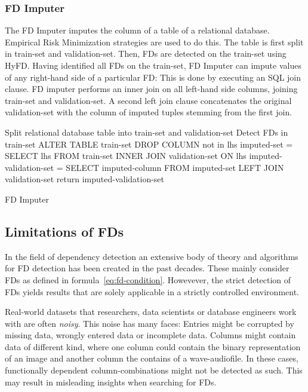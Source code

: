 \subsubsection{FD Imputer}
The FD Imputer imputes the column of a table of a relational database.
Empirical Risk Minimization strategies are used to do this.
The table is first split in train-set and validation-set.
Then, FDs are detected on the train-set using HyFD.\cite{PAP16}
Having identified all FDs on the train-set, FD Imputer can impute values of any right-hand side of a particular FD:
This is done by executing an SQL join clause.
FD imputer performs an inner join on all left-hand side columns, joining train-set and validation-set.
A second left join clause concatenates the original validation-set with the column of imputed tuples stemming from the first join.
\begin{algorithm}[ht]
    \DontPrintSemicolon
    \SetAlgoLined
    \BlankLine

    Split relational database table into train-set and validation-set\;
    Detect FDs in train-set\;
    ALTER TABLE train-set DROP COLUMN not in lhs\;
    imputed-set = SELECT lhs FROM train-set INNER JOIN validation-set ON lhs\;
    imputed-validation-set = SELECT imputed-column FROM imputed-set LEFT JOIN validation-set\;
    return imputed-validation-set\;
    \caption{FD Imputer}
\end{algorithm}

\subsection{Limitations of FDs}
In the field of dependency detection an extensive body of theory and algorithms for FD detection has been created in the past decades.\cite[p.~1]{PAP15}
These mainly consider FDs as defined in formula~\ref{eq:fd-condition}.
Howevever, the strict detection of FDs yields results that are solely applicable in a strictly controlled environment.

Real-world datasets that researchers, data scientists or database engineers work with are often \emph{noisy}.
This noise has many faces:
Entries might be corrupted by missing data, wrongly entered data or incomplete data.
Columns might contain data of different kind, where one column could contain the binary representation of an image and another column the contains of a wave-audiofile.
In these cases, functionally dependent column-combinations might not be detected as such.
This may result in misleading insights when searching for FDs.

